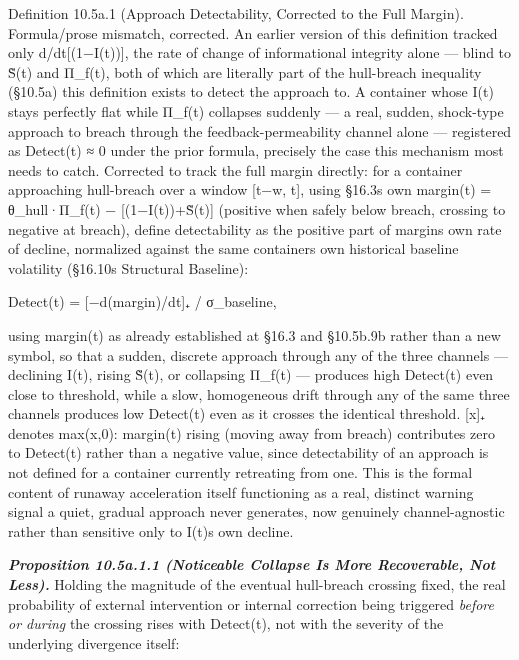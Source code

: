 \documentclass[
]{article}
\begin{document}
Definition 10.5a.1 (Approach Detectability, Corrected to the Full
Margin). Formula/prose mismatch, corrected. An earlier version of this
definition tracked only d/dt{[}(1−I(t)){]}, the rate of change of
informational integrity alone --- blind to S̃(t) and Π\_f(t), both of
which are literally part of the hull-breach inequality (§10.5a) this
definition exists to detect the approach to. A container whose I(t)
stays perfectly flat while Π\_f(t) collapses suddenly --- a real,
sudden, shock-type approach to breach through the feedback-permeability
channel alone --- registered as Detect(t) ≈ 0 under the prior formula,
precisely the case this mechanism most needs to catch. Corrected to
track the full margin directly: for a container approaching hull-breach
over a window {[}t−w, t{]}, using §16.3\textquotesingle s own margin(t)
= θ\_hull·Π\_f(t) − {[}(1−I(t))+S̃(t){]} (positive when safely below
breach, crossing to negative at breach), define detectability as the
positive part of margin\textquotesingle s own rate of decline,
normalized against the same container\textquotesingle s own historical
baseline volatility (§16.10\textquotesingle s Structural Baseline):

Detect(t) = {[}−d(margin)/dt{]}₊ / σ\_baseline,

using margin(t) as already established at §16.3 and §10.5b.9b rather
than a new symbol, so that a sudden, discrete approach through any of
the three channels --- declining I(t), rising S̃(t), or collapsing
Π\_f(t) --- produces high Detect(t) even close to threshold, while a
slow, homogeneous drift through any of the same three channels produces
low Detect(t) even as it crosses the identical threshold. {[}x{]}₊
denotes max(x,0): margin(t) rising (moving away from breach) contributes
zero to Detect(t) rather than a negative value, since detectability of
an approach is not defined for a container currently retreating from
one. This is the formal content of runaway acceleration itself
functioning as a real, distinct warning signal a quiet, gradual approach
never generates, now genuinely channel-agnostic rather than sensitive
only to I(t)\textquotesingle s own decline.

\emph{\textbf{Proposition 10.5a.1.1 (Noticeable Collapse Is More
Recoverable, Not Less).}} Holding the magnitude of the eventual
hull-breach crossing fixed, the real probability of external
intervention or internal correction being triggered \emph{before or
during} the crossing rises with Detect(t), not with the severity of the
underlying divergence itself:
\end{document}
